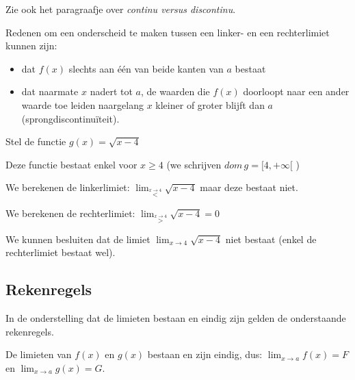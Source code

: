 Zie ook het paragraafje over \emph{continu versus discontinu}.

Redenen om een onderscheid te maken tussen een linker- en
een rechterlimiet kunnen zijn:
\begin{itemize}
\item dat $f(x)$ slechts aan \'e\'en van beide kanten van $a$ bestaat
\item dat naarmate $x$ nadert tot $a$, de waarden die $f(x)$ doorloopt
naar een ander waarde toe leiden naargelang $x$ kleiner of groter
blijft dan $a$ (sprongdiscontinu\"iteit).
\end{itemize}

\begin{voorbeeld}
	
Stel de functie $g(x)=\sqrt{x-4}$



Deze functie bestaat enkel voor $x\geq4$ (we schrijven $dom\,g=[4,+\infty[$
)

We berekenen de linkerlimiet: $\lim_{\overset{x\rightarrow4}{<}}\sqrt{x-4}$
maar deze bestaat niet.

We berekenen de rechterlimiet: $\lim_{\overset{x\rightarrow4}{>}}\sqrt{x-4}=0$ 

We kunnen besluiten dat de limiet $\lim_{x\to4}\sqrt{x-4}$
niet bestaat (enkel de rechterlimiet bestaat wel).

\end{voorbeeld}

\subsection{Rekenregels}

In de onderstelling dat de limieten bestaan en eindig zijn gelden
de onderstaande rekenregels.

De limieten van $f(x)$ en $g(x)$ bestaan en zijn eindig,
dus: $\lim_{x\to a}f(x)=F$ en $\lim_{x\to a}g(x)=G$.

